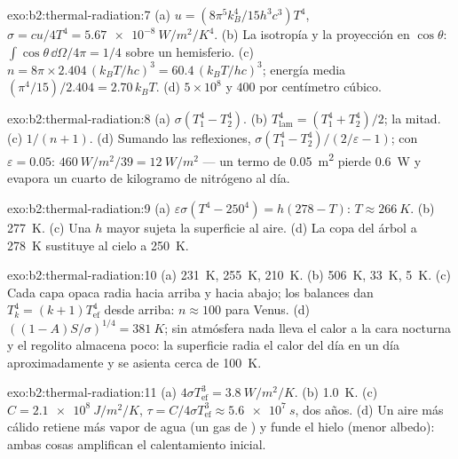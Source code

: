 \begin{solution}{exo:b2:thermal-radiation:7}
(a) $u = (8\pi^5k_B^4/15h^3c^3)T^4$, $\sigma = cu/4T^4 = \qty{5.67e-8}{W/m^2/K^4}$.
(b) La isotropía y la proyección en $\cos\theta$: $\int\cos\theta\,\dd\Omega/4\pi = 1/4$
sobre un hemisferio. (c) $n = 8\pi \times 2.404\,(k_BT/hc)^3 = 60.4\,(k_BT/hc)^3$;
energía media $(\pi^4/15)/2.404 = 2.70\,k_BT$. (d) $5 \times 10^8$ y $400$
por centímetro cúbico.
\end{solution}

\begin{solution}{exo:b2:thermal-radiation:8}
(a) $\sigma(T_1^4 - T_2^4)$. (b) $T_{\text{lam}}^4 = (T_1^4 + T_2^4)/2$; la mitad. (c)
$1/(n + 1)$. (d) Sumando las reflexiones, $\sigma(T_1^4 - T_2^4)/(2/\varepsilon -
1)$; con $\varepsilon = 0.05$: $\qty{460}{W/m^2}/39 = \qty{12}{W/m^2}$ --- un termo de
\qty{0.05}{m^2} pierde \qty{0.6}{W} y evapora un cuarto de kilogramo de
nitrógeno al día.
\end{solution}

\begin{solution}{exo:b2:thermal-radiation:9}
(a) $\varepsilon\sigma(T^4 - 250^4) = h(278 - T)$: $T \approx \qty{266}{K}$. (b)
\qty{277}{K}. (c) Una $h$ mayor sujeta la superficie al aire. (d) La copa del árbol
a \qty{278}{K} sustituye al cielo a \qty{250}{K}.
\end{solution}

\begin{solution}{exo:b2:thermal-radiation:10}
(a) \qty{231}{K}, \qty{255}{K}, \qty{210}{K}. (b) \qty{506}{K}, \qty{33}{K}, \qty{5}{K}.
(c) Cada capa opaca radia hacia arriba y hacia abajo; los balances dan
$T_k^4 = (k + 1)T_{\text{ef}}^4$ desde arriba: $n \approx 100$ para Venus. (d)
$((1 - A)S/\sigma)^{1/4} = \qty{381}{K}$; sin atmósfera nada lleva el
calor a la cara nocturna y el regolito almacena poco: la superficie
radia el calor del día en un día aproximadamente y se asienta cerca de
\qty{100}{K}.
\end{solution}

\begin{solution}{exo:b2:thermal-radiation:11}
(a) $4\sigma T_{\text{ef}}^3 = \qty{3.8}{W/m^2/K}$. (b) \qty{1.0}{K}. (c) $C =
\qty{2.1e8}{J/m^2/K}$, $\tau = C/4\sigma T_{\text{ef}}^3 \approx \qty{5.6e7}{s}$, dos
años. (d) Un aire más cálido retiene más vapor de agua (un gas de ) y
funde el hielo (menor albedo): ambas cosas amplifican el calentamiento inicial.
\end{solution}

